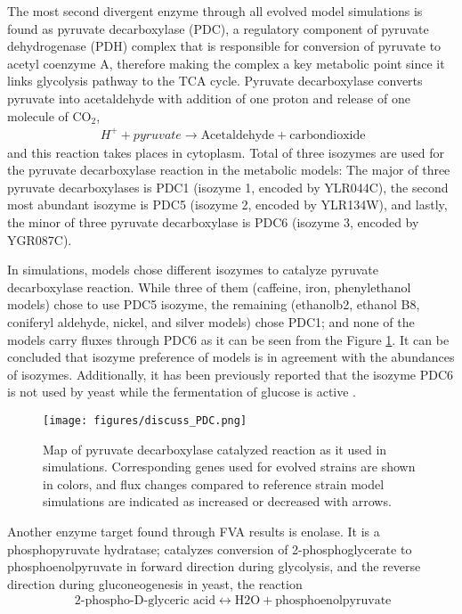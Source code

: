 The most second divergent enzyme through all evolved model simulations is found as pyruvate decarboxylase (PDC), a regulatory component of pyruvate dehydrogenase (PDH) complex that is responsible for conversion of pyruvate to acetyl coenzyme A, therefore making the complex a key metabolic point since it links glycolysis pathway to the TCA cycle. Pyruvate decarboxylase converts pyruvate into acetaldehyde with addition of one proton and release of one molecule of CO$_2$,
\begin{align}
\label{eq:pyrdec}
\ H^+ + pyruvate \rightarrow \text{Acetaldehyde} + \text{carbondioxide}
\end{align}
and this reaction takes places in cytoplasm. Total of three isozymes are used for the pyruvate decarboxylase reaction in the metabolic models: The major of three pyruvate decarboxylases is PDC1 (isozyme 1, encoded by YLR044C), the second most abundant isozyme is PDC5 (isozyme 2, encoded by YLR134W), and lastly, the minor of three pyruvate decarboxylase is PDC6 (isozyme 3, encoded by YGR087C).

In simulations, models chose different isozymes to catalyze pyruvate decarboxylase reaction. While three of them (caffeine,  iron,  phenylethanol models) chose to use PDC5 isozyme, the remaining (ethanolb2, ethanol B8, coniferyl aldehyde, nickel, and silver models) chose PDC1; and none of the models carry fluxes through PDC6 as it can be seen from the Figure \ref{fig:discuss_PDC}. It can be concluded that isozyme preference of models is in agreement with the abundances of isozymes. Additionally, it has been previously reported that the isozyme PDC6 is not used by yeast while the fermentation of glucose is active \cite{hohmann1991pdc6}.

\begin{figure}[H]
\texttt{[image: figures/discuss\_PDC.png]}
\caption[Map of pyruvate decarboxylase catalyzed reaction as it used in simulations]{Map of pyruvate decarboxylase catalyzed reaction as it used in simulations. Corresponding genes used for evolved strains are shown in colors, and flux changes compared to reference strain model simulations are indicated as increased or decreased with arrows.}
\label{fig:discuss_PDC}
\end{figure}

\vspace{-0.5cm}

Another enzyme target found through FVA results is enolase. It is a phosphopyruvate hydratase; catalyzes conversion of 2-phosphoglycerate to phosphoenolpyruvate in forward direction during glycolysis, and the reverse direction during gluconeogenesis in yeast, the reaction
\begin{align}
  \label{eq:enolase}
  \ \text{2-phospho-D-glyceric acid} \leftrightarrow \text{H2O} + \text{phosphoenolpyruvate}
\end{align}


